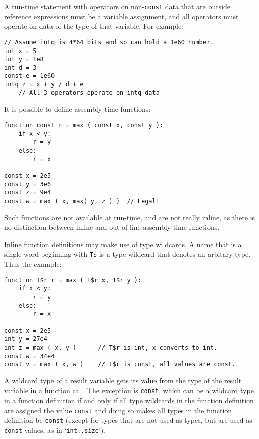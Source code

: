\documentclass[12pt]{article}
\newenvironment{indpar}[1][0.3in]%
	{\begin{list}{}%
		     {\setlength{\itemsep}{0in}%
		      \setlength{\topsep}{0in}%
		      \setlength{\parsep}{1ex}%
		      \setlength{\labelwidth}{#1}%
		      \setlength{\leftmargin}{#1}%
		      \addtolength{\leftmargin}{\labelsep}}%
	 \item}%
	{\end{list}}
\begin{document}
A run-time statement with operators on non-{\tt const} data
that are outside reference expressions must be a variable
assignment, and all operators must operate on data of the
type of that variable.  For example:

\begin{indpar}\begin{verbatim}
// Assume intq is 4*64 bits and so can hold a 1e60 number.
int x = 5
int y = 1e8
int d = 3
const e = 1e60
intq z = x + y / d + e
    // All 3 operators operate on intq data
\end{verbatim}\end{indpar}

It is possible to define assembly-time functions:

\begin{indpar}\begin{verbatim}
function const r = max ( const x, const y ):
    if x < y:
        r = y
    else:
        r = x

const x = 2e5
const y = 3e6
const z = 9e4
const w = max ( x, max( y, z ) )  // Legal!
\end{verbatim}\end{indpar}

Such functions are not available at run-time, and
are not really inline, as there is no
distinction between inline and out-of-line assembly-time functions.

Inline function definitions may make use of type wildcards.
A name that is a single word beginning with {\tt T\$}
is a type wildcard that denotes
an arbitary type.  Thus the example:

\begin{indpar}\begin{verbatim}
function T$r r = max ( T$r x, T$r y ):
    if x < y:
        r = y
    else:
        r = x

const x = 2e5
int y = 27e4
int z = max ( x, y )      // T$r is int, x converts to int.
const w = 34e4
const v = max ( x, w )    // T$r is const, all values are const.
\end{verbatim}\end{indpar}

A wildcard type of a result variable gets its value from the
type of the result variable in a function call.  The exception
is {\tt const}, which can be a wildcard type in a function
definition if and only if all type wildcards in the function definition
are assigned the value {\tt const} and doing so makes
all types in the function definition be {\tt const}
(except for types that are not used as types, but are used as
{\tt const} values, as in `{\tt int..size}').
\end{document}
